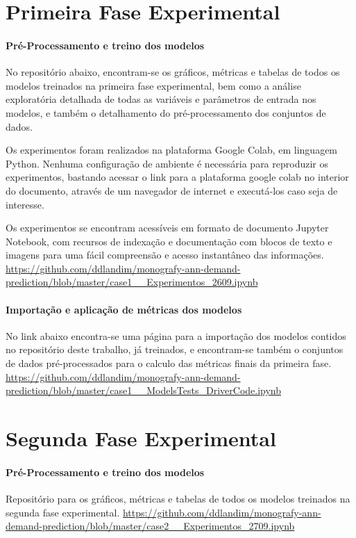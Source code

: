 	\section{Primeira Fase Experimental}
	    \paragraph{Pré-Processamento e treino dos modelos}
	        No repositório abaixo, encontram-se os gráficos, métricas e tabelas de todos os modelos treinados na primeira fase experimental, bem como a análise exploratória detalhada de todas as variáveis e parâmetros de entrada nos modelos, e também o detalhamento do pré-processamento dos conjuntos de dados.
	        
	        Os experimentos foram realizados na plataforma Google Colab, em linguagem Python. Nenhuma configuração de ambiente é necessária para reproduzir os experimentos, bastando acessar o link para a plataforma google colab no interior do documento, através de um navegador de internet e executá-los caso seja de interesse.
	        
	        Os experimentos se encontram acessíveis em formato de documento Jupyter Notebook, com recursos de indexação e documentação com blocos de texto e imagens para uma fácil compreensão e acesso instantâneo das informações. \url{https://github.com/ddlandim/monografy-ann-demand-prediction/blob/master/case1__Experimentos_2609.ipynb}
            
	    \paragraph{Importação e aplicação de métricas dos modelos}
	        No link abaixo encontra-se uma página para a importação dos modelos contidos no repositório deste trabalho, já treinados, e encontram-se também o conjuntos de dados pré-processados para o calculo das métricas finais da primeira fase. \url{https://github.com/ddlandim/monografy-ann-demand-prediction/blob/master/case1__ModelsTests_DriverCode.ipynb}
	 
	\section{Segunda Fase Experimental}
	    \paragraph{Pré-Processamento e treino dos modelos}
	        Repositório para os gráficos, métricas e tabelas de todos os modelos treinados na segunda fase experimental. \url{https://github.com/ddlandim/monografy-ann-demand-prediction/blob/master/case2__Experimentos_2709.ipynb}
